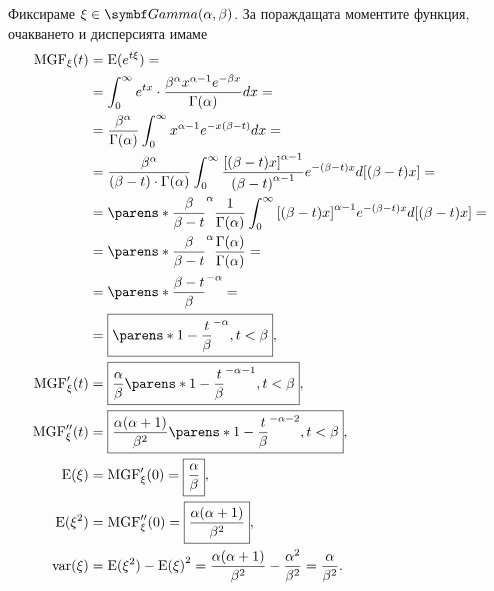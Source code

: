 \documentclass{../../common/topic}
\begin{document}
Фиксираме \( \xi \in \distr{Gamma}(\alpha, \beta) \). За пораждащата моментите функция, очакването и дисперсията имаме
\begingroup
\allowdisplaybreaks
\begin{align*}
  \MGF_\xi(t)
  &=
  \Expect(e^{t\xi})
  = \\ &=
  \int_0^\infty e^{tx} \cdot \frac {\beta^\alpha x^{\alpha-1} e^{-\beta x}} {\Gamma(\alpha)} dx
  = \\ &=
  \frac {\beta^\alpha} {\Gamma(\alpha)} \int_0^\infty x^{\alpha-1} e^{-x(\beta-t)} dx
  = \\ &=
  \frac {\beta^\alpha} {(\beta-t) \cdot \Gamma(\alpha)} \int_0^\infty \frac {{[(\beta-t)x]}^{\alpha-1}} {{(\beta-t)}^{\alpha-1}} e^{-(\beta-t)x} d[(\beta-t)x]
  = \\ &=
  {\parens*{\frac \beta {\beta-t} }}^\alpha \frac 1 {\Gamma(\alpha)} \int_0^\infty {[(\beta-t)x]}^{\alpha-1} e^{-(\beta-t)x} d[(\beta-t)x]
  = \\ &=
  {\parens*{\frac \beta {\beta-t} }}^\alpha \frac {\Gamma(\alpha)} {\Gamma(\alpha)}
  = \\ &=
  {\parens*{\frac {\beta-t} \beta }}^{-\alpha}
  = \\ &=
  \boxed{{\parens*{1 - \frac t \beta }}^{-\alpha}, t < \beta},
  \\
  \MGF'_\xi(t)
  &=
  \boxed{\frac \alpha \beta {\parens*{1 - \frac t \beta }}^{-\alpha-1}, t < \beta},
  \\
  \MGF''_\xi(t)
  &=
  \boxed{\frac {\alpha(\alpha+1)} {\beta^2} {\parens*{1 - \frac t \beta }}^{-\alpha-2}, t < \beta},
  \\
  \Expect(\xi)
  &=
  \MGF'_\xi(0)
  =
  \boxed{\frac \alpha \beta},
  \\
  \Expect(\xi^2)
  &=
  \MGF''_\xi(0)
  =
  \boxed{\frac {\alpha(\alpha+1)} {\beta^2}},
  \\
  \var(\xi)
  &=
  \Expect(\xi^2) - {\Expect(\xi)}^2
  =
  \frac {\alpha(\alpha+1)} {\beta^2} - \frac {\alpha^2} {\beta^2}
  =
  \frac \alpha {\beta^2}.
\end{align*}
\endgroup
\end{document}
